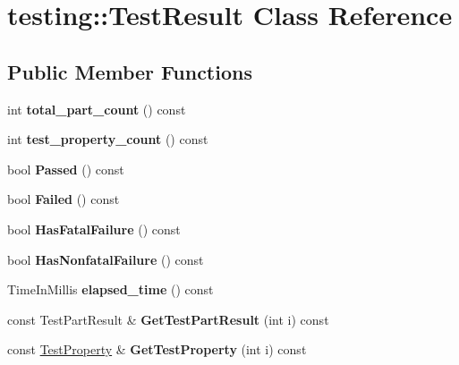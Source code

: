 \hypertarget{classtesting_1_1TestResult}{}\section{testing\+:\+:Test\+Result Class Reference}
\label{classtesting_1_1TestResult}
\subsection*{Public Member Functions}
\begin{DoxyCompactItemize}
\item 
\mbox{\label{classtesting_1_1TestResult_a6174aa4019dcda7c34d776b5741c9032}} 
int {\bfseries total\+\_\+part\+\_\+count} () const
\item 
\mbox{\label{classtesting_1_1TestResult_afe4523257bbea8bc63b0950b702790be}} 
int {\bfseries test\+\_\+property\+\_\+count} () const
\item 
\mbox{\label{classtesting_1_1TestResult_acf7e6e72f05a0545c48ea48e7f8851df}} 
bool {\bfseries Passed} () const
\item 
\mbox{\label{classtesting_1_1TestResult_afacc37e8b43c8574e4101bc61723c769}} 
bool {\bfseries Failed} () const
\item 
\mbox{\label{classtesting_1_1TestResult_a30e00d4076ae07fb5ad7b623d9dc1fe4}} 
bool {\bfseries Has\+Fatal\+Failure} () const
\item 
\mbox{\label{classtesting_1_1TestResult_a510564fa67b485ed4589a259f2a032d6}} 
bool {\bfseries Has\+Nonfatal\+Failure} () const
\item 
\mbox{\label{classtesting_1_1TestResult_a717e05e00d4af5cb809433e343ab63af}} 
Time\+In\+Millis {\bfseries elapsed\+\_\+time} () const
\item 
\mbox{\label{classtesting_1_1TestResult_a765c1e734ac08115757b343d57226bba}} 
const Test\+Part\+Result \& {\bfseries Get\+Test\+Part\+Result} (int i) const
\item 
\mbox{\label{classtesting_1_1TestResult_a6c2f478dbce36b57d18bedded46d70af}} 
const \hyperlink{classtesting_1_1TestProperty}{Test\+Property} \& {\bfseries Get\+Test\+Property} (int i) const
\end{DoxyCompactItemize}
